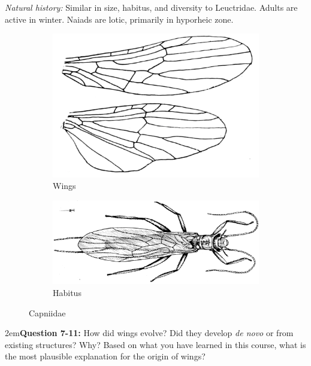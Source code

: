 \documentclass[letterpaper, 11pt]{article}
\begin{document}
\noindent{}\textit{Natural history:} Similar in size, habitus, and diversity to Leuctridae. Adults are active in winter. Naiads are lotic, primarily in hyporheic zone.\\

\begin{figure}[ht!]
    \centering
    \begin{subfigure}[ht!]{0.4\textwidth}
        \includegraphics[width=\textwidth]{CapniidWings}
        \caption{Wings \citep[modified from][Plate 47, Fig. 2]{bhl29875}}
        \label{fig:capniid1}
    \end{subfigure}
    \qquad
    \begin{subfigure}[ht!]{0.5\textwidth}
        \includegraphics[width=\textwidth]{CapniidHabitus}
        \caption{Habitus \citep[modified from][Fig. 28]{bhl29875}}
        \label{fig:capniid2}
    \end{subfigure}
    \caption{Capniidae}\label{fig:capniids}
\end{figure}

\hangindent2em\textbf{Question 7-11:} How did wings evolve? Did they develop \textit{de novo} or from existing structures? Why? Based on what you have learned in this course, what is the most plausible explanation for the origin of wings?
\end{document}
